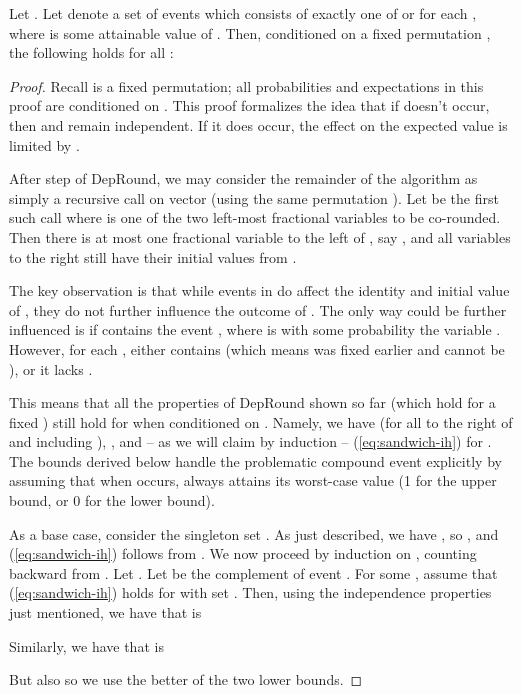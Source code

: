 \begin{lemma}\label{lemma:sandwich1} Let .
Let  denote a set of events which consists of exactly one of  or  for each , where  is some attainable value of . Then, conditioned on a fixed permutation , the following holds for all : 

\end{lemma}
\begin{proof}
Recall  is a fixed permutation; all probabilities and expectations in this proof are conditioned on . This proof formalizes the idea that if  doesn't occur, then  and  remain independent. If it does occur, the effect on the expected value is limited by .

After step  of {\sc DepRound}, we may consider the remainder of the algorithm as simply a recursive call on vector  (using the same permutation ). Let  be the first such call where  is one of the two left-most fractional variables to be co-rounded. Then there is at most one fractional variable to the left of , say , and all variables to the right still have their initial values from .

The key observation is that while events in  do affect the identity and initial value of , they do not further influence the outcome of . The only way  could be further influenced is if  contains the event , where  is with some probability the variable . However, for each ,  either contains  (which means  was fixed earlier and cannot be ), or it lacks .

This means that all the properties of {\sc DepRound} shown so far (which hold for a fixed ) still hold for  when conditioned on . Namely, we have  (for all  to the right of and including ), , and -- as we will claim by induction --  (\ref{eq:sandwich-ih}) for .
The bounds derived below handle the problematic compound event  explicitly by assuming that when  occurs,  always attains its worst-case value (1 for the upper bound, or 0 for the lower bound).

As a base case, consider the singleton set . As just described, we have  , so , and (\ref{eq:sandwich-ih}) follows from .
We now proceed by induction on , counting backward from . Let . Let  be the complement of event .  For some , assume that (\ref{eq:sandwich-ih}) holds for  with set . Then, using the independence properties just mentioned, we have that  is

Similarly, we have that  is

But also  so we use the better of the two lower bounds.
\end{proof} 


